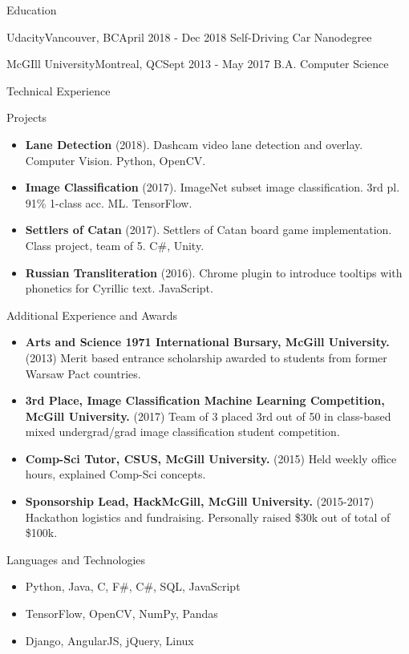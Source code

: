 \documentclass[]{muchicv}
\begin{document}
	\begin{cvsection}{Education}
		\begin{cvsubsection}{Udacity}{Vancouver, BC}{April 2018 - Dec 2018}
			Self-Driving Car Nanodegree
		\end{cvsubsection}
		\begin{cvsubsection}{McGIll University}{Montreal, QC}{Sept 2013 - May 2017}
			B.A. Computer Science
		\end{cvsubsection}
	\end{cvsection}
	
	\begin{cvsection}{Technical Experience}
		\begin{cvsubsection}{Projects}{}{}
			\begin{itemize}
				\item \textbf{Lane Detection} (2018). Dashcam video lane detection and overlay. Computer Vision. Python, OpenCV.
				\item \textbf{Image Classification} (2017). ImageNet subset image classification. 3rd pl. 91\% 1-class acc. ML. TensorFlow.
				\item \textbf{Settlers of Catan} (2017).  Settlers of Catan board game implementation. Class project, team of 5. C\#, Unity.
				\item \textbf{Russian Transliteration} (2016). Chrome plugin to introduce tooltips with phonetics for Cyrillic text. JavaScript.
			\end{itemize}
		\end{cvsubsection}
	\end{cvsection}
	
	\begin{cvsection}{Additional Experience and Awards}
		\begin{cvsubsection}{}{}{}	
			\begin{itemize}
				\item \textbf{Arts and Science 1971 International Bursary, McGill University.} (2013) Merit based entrance scholarship awarded to students from former Warsaw Pact countries.
				\item \textbf{3rd Place, Image Classification Machine Learning Competition, McGill University.} (2017) Team of 3 placed 3rd out of 50 in class-based mixed undergrad/grad image classification student competition.
				\item \textbf{Comp-Sci Tutor, CSUS, McGill University.} (2015) Held weekly office hours, explained Comp-Sci concepts.
				\item \textbf{Sponsorship Lead, HackMcGill, McGill University.} (2015-2017) Hackathon logistics and fundraising. \newline Personally raised \$30k out of total of \$100k.
			\end{itemize}
		\end{cvsubsection}
	\end{cvsection}
	
	\begin{cvsection}{Languages and Technologies}
		\begin{cvsubsection}{}{}{}	
			\begin{itemize}
				\item Python, Java, C, F\#, C\#, SQL, JavaScript 
				\item TensorFlow, OpenCV, NumPy, Pandas
				\item Django, AngularJS, jQuery, Linux
			\end{itemize}
		\end{cvsubsection}
	\end{cvsection}
	
\end{document}
